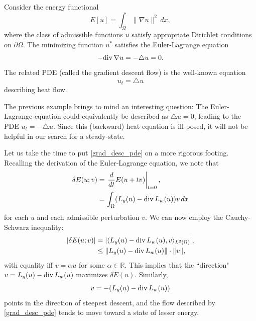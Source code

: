 \begin{example}
Consider the energy functional 
\[ E[u] = \int_{\Omega} \|\nabla u\|^2 \, dx,\]
where the class of admissible functions $u$ satisfy appropriate Dirichlet conditions on $\partial \Omega$. 
The minimizing function $u^*$ satisfies the Euler-Lagrange equation
\[-{\rm div}\, \nabla u	= - \triangle u = 0.\]
The related PDE (called the gradient descent flow) is the well-known equation
\[u_t = \triangle u\]
describing heat flow.
\end{example}

The previous example brings to mind an interesting question: The Euler-Lagrange equation could equivalently be described as $\triangle u = 0$, leading to the PDE $u_t = -\triangle u$. 
Since this (backward) heat equation is ill-posed, it will not be helpful in our search for a steady-state. 

Let us take the time to put \eqref{grad_desc_pde} on a more rigorous footing. 
Recalling the derivation of the Euler-Lagrange equation, we note that 
\begin{align*}
		\delta E(u;v) &= \left.\frac{d}{dt}E(u + tv)\right|_{t=0},\\
		&= \int_{\Omega} (L_y(u) - {\rm div}\, L_w(u)) v\, dx
\end{align*}
for each $u$ and each admissible perturbation $v$.
We can now employ the Cauchy-Schwarz inequality: 
\begin{align*}
	|\delta E(u;v)| &= | \langle L_y(u) - {\rm div}\, L_w(u), v \rangle_{L^2(\Omega)} |,\\
	&\leq \|L_y(u) - {\rm div}\, L_w(u)\| \cdot \| v \|,
\end{align*}
with equality iff $v =\alpha u$ for some $\alpha \in \mathbb{R}$. 
This implies that the ``direction" 
$v = L_y(u) - {\rm div}\, L_w(u)$
maximizes $\delta E(u)$. 
Similarly,
\[v = -(L_y(u) - {\rm div}\, L_w(u))\]
 points in the direction of steepest descent, and the flow described by \eqref{grad_desc_pde} tends to move toward a state of lesser energy. 


